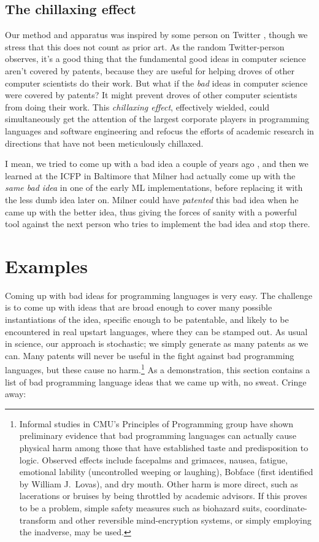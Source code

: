 \documentclass[acmtocl]%
{boviktrans}
\begin{document}
\subsection{The chillaxing effect}

Our method and apparatus was inspired by some person on Twitter
\cite{tweet}, though we stress that this does not count as prior art.
As the random Twitter-person observes, it's a good thing that the
fundamental good ideas in computer science aren't covered by patents,
because they are useful for helping droves of other computer
scientists do their work.  But what if the {\it bad} ideas in computer
science were covered by patents? It might prevent droves of other
computer scientists from doing their work. This {\it chillaxing
  effect}, effectively wielded, could simultaneously get the attention
of the largest corporate players in programming languages and software
engineering and refocus the efforts of academic research in directions
that have not been meticulously chillaxed.

I mean, we tried to come up with a bad idea a couple of years ago
\cite{sigbovik10}, and then we learned at the ICFP in Baltimore that
Milner had actually come up with the {\it same bad idea} in one of the
early ML implementations, before replacing it with the less dumb idea
later on. Milner could have {\it patented} this bad idea when he came
up with the better idea, thus giving the forces of sanity with a
powerful tool against the next person who tries to implement the bad
idea and stop there.

\section{Examples}


Coming up with bad ideas for programming languages is very easy. The
challenge is to come up with ideas that are broad enough to cover many
possible instantiations of the idea, specific enough to be patentable,
and likely to be encountered in real upstart languages, where they can
be stamped out. As usual in science, our approach is stochastic; we
simply generate as many patents as we can. Many patents will never be
useful in the fight against bad programming languages, but these cause
no harm.\!\footnote{Informal studies in CMU's Principles of
  Programming group have shown preliminary evidence that bad
  programming languages can actually cause physical harm among those
  that have established taste and predisposition to logic. Observed
  effects include facepalms and grimaces, nausea, fatigue, emotional
  lability (uncontrolled weeping or laughing), Bobface (first identified
  by William J.~Lovas), and dry mouth. Other harm is more direct, such
  as lacerations or bruises by being throttled by academic advisors.
  If this proves to be a problem, simple safety measures such as biohazard
  suits, coordinate-transform and other reversible mind-encryption systems,
  or simply employing the inadverse, may be used.}
As a demonstration, this section contains a list of bad programming language
ideas that we came up with, no sweat. Cringe away:
\end{document}
